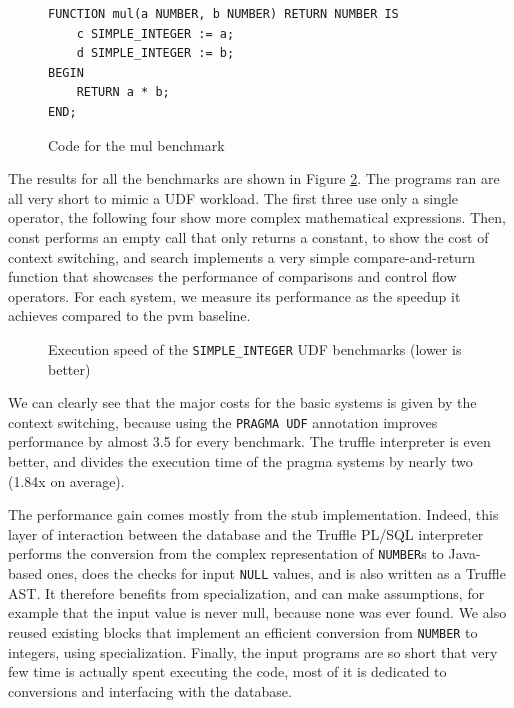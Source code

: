 \documentclass[twoside,11pt,a4paper]{article}
\newcommand{\pls}[1]{\small\texttt{#1}\normalsize}
\newcommand{\plstype}[1]{\pls{#1}}
\newcommand{\oranum}{\plstype{NUMBER}}
\newcommand{\simpleint}{\plstype{SIMPLE\_INTEGER}}
\newcommand{\plsnull}{\pls{NULL}}
\newcommand{\benchsystem}[1]{\textsf{#1}}
\newcommand{\pvm}{\benchsystem{pvm}}
\newcommand{\truffle}{\benchsystem{truffle}}
\newcommand{\bench}[1]{\textsf{#1}}
\begin{document}
\begin{figure}[hbt]
	\begin{lstlisting}[style=PLSQL, frame=L]
FUNCTION mul(a NUMBER, b NUMBER) RETURN NUMBER IS
	c SIMPLE_INTEGER := a;
	d SIMPLE_INTEGER := b;
BEGIN
	RETURN a * b;
END;
	\end{lstlisting}
	\caption{Code for the \bench{mul} benchmark}
	\label{fig:mulbench}
\end{figure}

The results for all the benchmarks are shown in Figure \ref{fig:exp1a}. The programs ran are all very short to mimic a UDF workload. The first three use only a single operator, the following four show more complex mathematical expressions. Then, \bench{const} performs an empty call that only returns a constant, to show the cost of context switching, and \bench{search} implements a very simple compare-and-return function that showcases the performance of comparisons and control flow operators. For each system, we measure its performance as the speedup it achieves compared to the \pvm{} baseline.

\begin{figure}[tp]
	\centering
	\caption[Execution speed of the \simpleint{} UDF benchmarks]{Execution speed of the \simpleint{} UDF benchmarks (lower is better)}
	\label{fig:exp1a}
\end{figure}

We can clearly see that the major costs for the basic systems is given by the context switching, because using the \pls{PRAGMA UDF} annotation improves performance by almost 3.5 for every benchmark. The \truffle{} interpreter is even better, and divides the execution time of the \benchsystem{pragma} systems by nearly two (1.84x on average).

The performance gain comes mostly from the stub implementation. Indeed, this layer of interaction between the database and the Truffle PL/SQL interpreter performs the conversion from the complex representation of \oranum{}s to Java-based ones, does the checks for input \plsnull{} values, and is also written as a Truffle AST. It therefore benefits from specialization, and can make assumptions, for example that the input value is never null, because none was ever found. We also reused existing blocks that implement an efficient conversion from \oranum{} to integers, using specialization. Finally, the input programs are so short that very few time is actually spent executing the code, most of it is dedicated to conversions and interfacing with the database.
\end{document}
